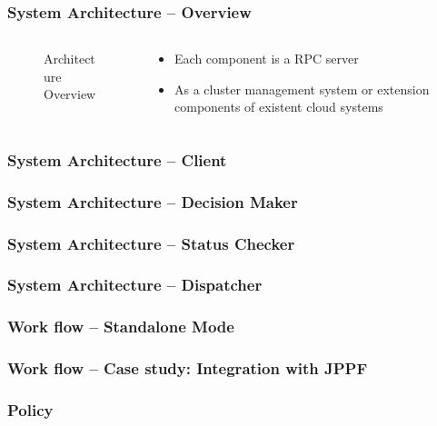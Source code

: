 \documentclass{beamer}
\begin{document}
\begin{frame}[label=my-frame]
  \frametitle{System Architecture -- Overview}
  \begin{columns}
    \begin{column}{.5\textwidth}
      \begin{figure}
        \resizebox{\linewidth}{!}{
          
        }
        \caption{Architecture Overview}
        \label{fig:archi-overview}
      \end{figure}
    \end{column}
    \begin{column}{.5\textwidth}
      \begin{itemize}
        \item Each component is a RPC server
        \item As a cluster management system or extension
          components of existent cloud systems
      \end{itemize}
    \end{column}
  \end{columns}
\end{frame}
\begin{frame}
  \frametitle{System Architecture -- Client}
\end{frame}
\begin{frame}
  \frametitle{System Architecture -- Decision Maker}
\end{frame}
\begin{frame}
  \frametitle{System Architecture -- Status Checker}
\end{frame}
\begin{frame}
  \frametitle{System Architecture -- Dispatcher}
\end{frame}
\begin{frame}
  \frametitle{Work flow -- Standalone Mode}
\end{frame}
\begin{frame}
  \frametitle{Work flow -- Case study: Integration with JPPF}
\end{frame}
\begin{frame}
  \frametitle{Policy}
\end{frame}
\end{document}
